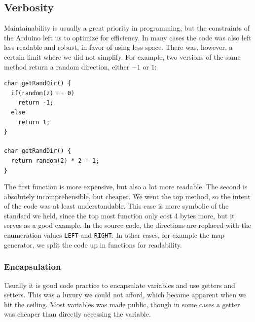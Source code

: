 \subsection*{Verbosity} %
Maintainability is usually a great priority in programming, but the constraints of the Arduino left us to optimize for efficiency. In many cases the code was also left less readable and robust, in favor of using less space. There was, however, a certain limit where we did not simplify. For example, two versions of the same method return a random direction, either $-1$ or $1$:
\begin{verbatim}
char getRandDir() {
  if(random(2) == 0)
    return -1;
  else
    return 1;
}

char getRandDir() {
  return random(2) * 2 - 1;
}
\end{verbatim}
The first function is more expensive, but also a lot more readable. The second is absolutely incomprehensible, but cheaper. We went the top method, so the intent of the code was at least understandable. This case is more symbolic of the standard we held, since the top most function only cost 4 bytes more, but it serves as a good example. In the source code, the directions are replaced with the enumeration values {\tt LEFT} and {\tt RIGHT}. In other cases, for example the map generator, we split the code up in functions for readability.

\subsubsection*{Encapsulation} %
Usually it is good code practice to encapsulate variables and use getters and setters. This was a luxury we could not afford, which became apparent when we hit the ceiling. Most variables was made public, though in some cases a getter was cheaper than directly accessing the variable.



